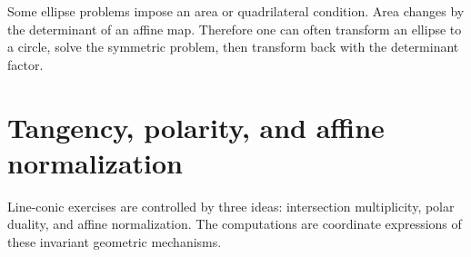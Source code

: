 Some ellipse problems impose an area or quadrilateral condition.  Area changes by the determinant of an affine map.  Therefore one can often transform an ellipse to a circle, solve the symmetric problem, then transform back with the determinant factor.

\section{Tangency, polarity, and affine normalization}

Line-conic exercises are controlled by three ideas: intersection multiplicity, polar duality, and affine normalization.  The computations are coordinate expressions of these invariant geometric mechanisms.

